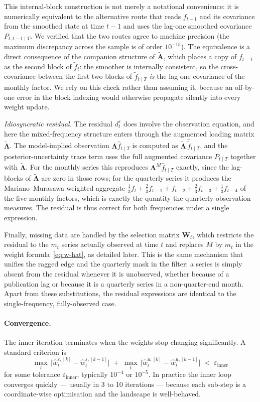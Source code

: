 \documentclass[11pt, a4paper, oneside]{article}
\newcommand{\mL}{\boldsymbol{\Lambda}}
\newcommand{\mA}{\mathbf{A}}
\begin{document}
This internal-block construction is not merely a notational
convenience: it is numerically equivalent to the alternative route
that reads $f_{t-1}$ and its covariance from the smoothed state at
time $t-1$ and uses the lag-one smoothed covariance
$P_{t,t-1 \mid T}$. We verified that the two routes agree to machine
precision (the maximum discrepancy across the sample is of order
$10^{-15}$). The equivalence is a direct consequence of the companion
structure of $\tilde{\mA}$, which places a copy of $f_{t-1}$ as the
second block of $\tilde{f}_t$: the smoother is internally consistent,
so the cross-covariance between the first two blocks of
$\tilde{f}_{t \mid T}$ \emph{is} the lag-one covariance of the
monthly factor. We rely on this check rather than assuming it,
because an off-by-one error in the block indexing would otherwise
propagate silently into every weight update.

\medskip
\noindent\emph{Idiosyncratic residual.}
The residual $d^\varepsilon_t$ does involve the observation equation,
and here the mixed-frequency structure enters through the augmented
loading matrix $\tilde{\mL}$. The model-implied observation
$\boldsymbol{\Lambda}\hat{f}_{t \mid T}$ is computed as
$\tilde{\mL}\,\hat{\tilde{f}}_{t \mid T}$, and the posterior-uncertainty
trace term uses the full augmented covariance $P_{t \mid T}$ together
with $\tilde{\mL}$. For the monthly series this reproduces
$\mL^{M}\hat{f}_{t \mid T}$ exactly, since the lag-blocks of
$\tilde{\mL}$ are zero in those rows; for the quarterly series it
produces the Mariano--Murasawa weighted aggregate
$\tfrac{1}{3}f_t + \tfrac{2}{3}f_{t-1} + f_{t-2} + \tfrac{2}{3}f_{t-3}
+ \tfrac{1}{3}f_{t-4}$ of the five monthly factors, which is exactly
the quantity the quarterly observation measures. The residual is thus
correct for both frequencies under a single expression.

Finally, missing data are handled by the selection matrix
$\mathbf{W}_t$, which restricts the residual to the $m_t$ series
actually observed at time $t$ and replaces $M$ by $m_t$ in the
weight formula~\eqref{eq:w-hat}, as detailed later. This is the same mechanism that
unifies the ragged edge and the quarterly mask in the filter: a
series is simply absent from the residual whenever it is unobserved,
whether because of a publication lag or because it is a quarterly
series in a non-quarter-end month. Apart from these substitutions,
the residual expressions are identical to the single-frequency,
fully-observed case.

\paragraph{Convergence.}
The inner iteration terminates when the weights stop changing
significantly. A standard criterion is
\[
\max_t\, \Big|\hat{w}^{\varepsilon,[k]}_t - \hat{w}^{\varepsilon,[k-1]}_t\Big|
\;+\;
\max_t\, \Big|\hat{w}^{u,[k]}_t - \hat{w}^{u,[k-1]}_t\Big|
\;<\; \varepsilon_{\text{inner}}
\]
for some tolerance $\varepsilon_{\text{inner}}$, typically $10^{-4}$
or $10^{-5}$. In practice the inner loop converges quickly — usually
in 3 to 10 iterations — because each sub-step is a coordinate-wise
optimisation and the landscape is well-behaved.
\end{document}
